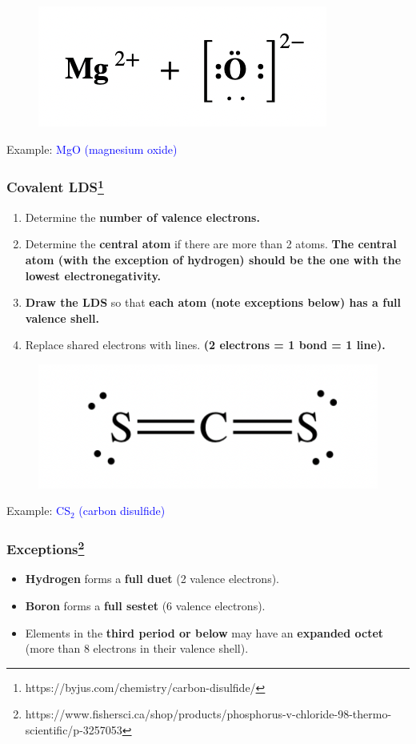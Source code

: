 \documentclass[a4paper, 12pt]{article}
\begin{document}
\begin{figure}[ht]
    \centering
    \includegraphics[width=0.5\linewidth]{ioniclds.png}
    \label{fig:2.5}
\end{figure}

\noindent Example: \textcolor{blue}{MgO (magnesium oxide)}

\subsubsection*{Covalent LDS\footnote{https://byjus.com/chemistry/carbon-disulfide/}}
\begin{enumerate}[leftmargin=*,nosep]
    \item Determine the \textbf{number of valence electrons.}
    \item Determine the \textbf{central atom} if there are more than 2 atoms. \textbf{The central atom (with the exception of hydrogen) should be the one with the lowest electronegativity.}
    \item \textbf{Draw the LDS} so that \textbf{each atom (note exceptions below) has a full valence shell.}
    \item Replace shared electrons with lines. \textbf{(2 electrons = 1 bond = 1 line).}
\end{enumerate}


\begin{figure}[ht]
    \centering
    \includegraphics[width=0.3\linewidth]{covalentlds.png}
    \label{fig:3}
\end{figure}

\noindent Example: \textcolor{blue}{CS$_2$ (carbon disulfide)}

\subsubsection*{Exceptions\footnote{https://www.fishersci.ca/shop/products/phosphorus-v-chloride-98-thermo-scientific/p-3257053}}
\begin{itemize}[leftmargin=*,nosep]
    \item \textbf{Hydrogen} forms a \textbf{full duet} (2 valence electrons).
    \item \textbf{Boron} forms a \textbf{full sestet} (6 valence electrons).
    \item Elements in the \textbf{third period or below} may have an \textbf{expanded octet} (more than 8 electrons in their valence shell).
\end{itemize}
\end{document}
